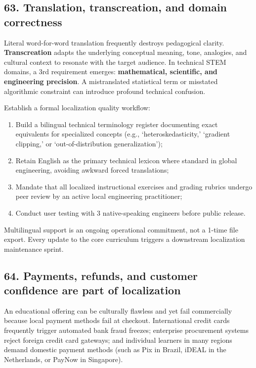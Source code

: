 \subsection{63. Translation, transcreation, and domain correctness}

Literal word-for-word translation frequently destroys pedagogical clarity. \textbf{Transcreation} adapts the underlying conceptual meaning, tone, analogies, and cultural context to resonate with the target audience. In technical STEM domains, a 3rd requirement emerges: \textbf{mathematical, scientific, and engineering precision}. A mistranslated statistical term or misstated algorithmic constraint can introduce profound technical confusion.

Establish a formal localization quality workflow:
\begin{enumerate}
    \item Build a bilingual technical terminology register documenting exact equivalents for specialized concepts (e.g., `heteroskedasticity,' `gradient clipping,' or `out-of-distribution generalization');
    \item Retain English as the primary technical lexicon where standard in global engineering, avoiding awkward forced translations;
    \item Mandate that all localized instructional exercises and grading rubrics undergo peer review by an active local engineering practitioner;
    \item Conduct user testing with 3 native-speaking engineers before public release.
\end{enumerate}
Multilingual support is an ongoing operational commitment, not a 1-time file export. Every update to the core curriculum triggers a downstream localization maintenance sprint.

\subsection{64. Payments, refunds, and customer confidence are part of localization}

An educational offering can be culturally flawless and yet fail commercially because local payment methods fail at checkout. International credit cards frequently trigger automated bank fraud freezes; enterprise procurement systems reject foreign credit card gateways; and individual learners in many regions demand domestic payment methods (such as Pix in Brazil, iDEAL in the Netherlands, or PayNow in Singapore).

